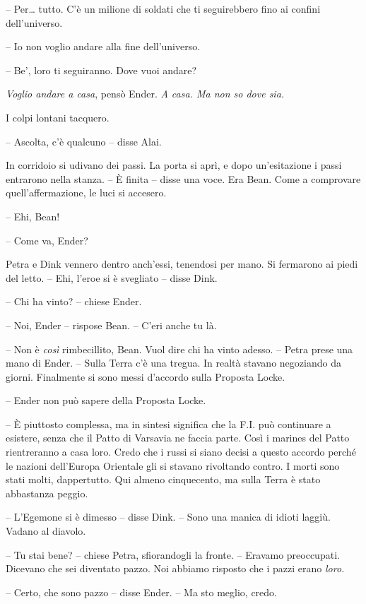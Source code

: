 {-- Per\ldots{} tutto. C'è un milione di soldati che ti seguirebbero
	fino ai confini dell'universo.}

{-- Io non voglio andare alla fine dell'universo.}

{-- Be', loro ti seguiranno. Dove vuoi andare?}

\emph{{Voglio andare a casa}}{, \emph{} pensò Ender. \emph{A casa. Ma
		non so dove sia.}}

{I colpi lontani tacquero.}

{-- Ascolta, c'è qualcuno -- disse Alai.}

{In corridoio si udivano dei passi. La porta si aprì, e dopo
	un'esitazione i passi entrarono nella stanza. -- È finita -- disse una
	voce. Era Bean. Come a comprovare quell'affermazione, le luci si
	accesero.}

{-- Ehi, Bean!}

{-- Come va, Ender?}

{Petra e Dink vennero dentro anch'essi, tenendosi per mano. Si fermarono
	ai piedi del letto. -- Ehi, l'eroe si è svegliato -- disse Dink.}

{-- Chi ha vinto? -- chiese Ender.}

{-- Noi, Ender -- rispose Bean. -- C'eri anche tu là.}

{-- Non è \emph{così} rimbecillito, Bean. Vuol dire chi ha vinto adesso.
	-- Petra prese una mano di Ender. -- Sulla Terra c'è una tregua. In
	realtà stavano negoziando da giorni. Finalmente si sono messi d'accordo
	sulla Proposta Locke.}

{-- Ender non può sapere della Proposta Locke.}

{-- È piuttosto complessa, ma in sintesi significa che la F.I. può
	continuare a esistere, senza che il Patto di Varsavia ne faccia parte.
	Così i marines del Patto rientreranno a casa loro. Credo che i russi si
	siano decisi a questo accordo perché le nazioni dell'Europa Orientale
	gli si stavano rivoltando contro. I morti sono stati molti, dappertutto.
	Qui almeno cinquecento, ma sulla Terra è stato abbastanza peggio.}

{-- L'Egemone si è dimesso -- disse Dink. -- Sono una manica di idioti
	laggiù. Vadano al diavolo.}

{-- Tu stai bene? -- chiese Petra, sfiorandogli la fronte. -- Eravamo
	preoccupati. Dicevano che sei diventato pazzo. Noi abbiamo risposto che
	i pazzi erano \emph{loro.}}

{-- Certo, che sono pazzo -- disse Ender. -- Ma sto meglio, credo.}

